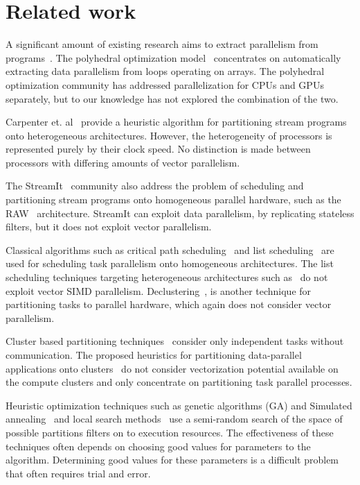 \section{Related work}
\label{sec:related-work}

A significant amount of existing research aims to extract parallelism
from programs~\cite{mgri98,mgor06,gsih93}. The
polyhedral optimization model~\cite{mgri98} concentrates on
automatically extracting data parallelism from loops operating on
arrays. The polyhedral optimization community has addressed
parallelization for CPUs and GPUs separately, but to our knowledge has
not explored the combination of the two.

Carpenter et. al~\cite{pcar09} provide a heuristic algorithm for
partitioning stream programs onto heterogeneous architectures.
However, the heterogeneity of processors is represented purely by
their clock speed. No distinction is made between processors with
differing amounts of vector parallelism.

The StreamIt~\cite{Thies2009} community also address the problem of
scheduling and partitioning stream programs onto homogeneous parallel
hardware, such as the RAW~\cite{ewai97} architecture. StreamIt can
exploit data parallelism, by replicating stateless filters, but it
does not exploit vector parallelism.

Classical algorithms such as critical path
scheduling~\cite{Kohler1975} and list scheduling~\cite{atho74}
are used for scheduling task parallelism onto homogeneous
architectures. The list scheduling techniques targeting heterogeneous
architectures such as~\cite{htop02} do not exploit vector SIMD
parallelism. Declustering~\cite{gsih93}, is another technique for
partitioning tasks to parallel hardware, which again does not consider
vector parallelism.

Cluster based partitioning techniques~\cite{tbra01}
consider only independent tasks without communication. The proposed
heuristics for partitioning data-parallel applications onto
clusters~\cite{ssan05,skum02} do not consider vectorization potential
available on the compute clusters and only concentrate on partitioning
task parallel processes.

Heuristic optimization techniques such as genetic algorithms
(GA) and Simulated annealing~\cite{265940,shroff1996genetic} and local search
methods~\cite{622584} use a semi-random search of the space of possible
partitions filters on to execution resources. The effectiveness of these
techniques often depends on choosing good values for parameters to the
algorithm. Determining good values for these parameters is a difficult problem
that often requires trial and error.

